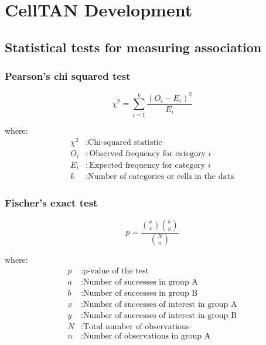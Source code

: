 \chapter{CellTAN Development}

\section{Statistical tests for measuring association} \label{ap1:stats}

\subsection{Pearson's chi squared test} \label{ap1:pearsonschi}

\begin{equation}
    \chi^2 = \sum_{i=1}^{k} \frac{(O_i - E_i)^2}{E_i}
\end{equation}
    
where:
\begin{align*}
\chi^2 & : \text{Chi-squared statistic} \\
O_i & : \text{Observed frequency for category } i \\
E_i & : \text{Expected frequency for category } i \\
k & : \text{Number of categories or cells in the data}
\end{align*}


\subsection{Fischer's exact test} \label{ap1:fischer}

\begin{equation}
    p = \frac{{\binom{a}{x} \binom{b}{y}}}{{\binom{N}{n}}}
\end{equation}

where:
\begin{align*}
    p & : \text{p-value of the test} \\
    a & : \text{Number of successes in group A} \\
    b & : \text{Number of successes in group B} \\
    x & : \text{Number of successes of interest in group A} \\
    y & : \text{Number of successes of interest in group B} \\
    N & : \text{Total number of observations} \\
    n & : \text{Number of observations in group A}
\end{align*}


